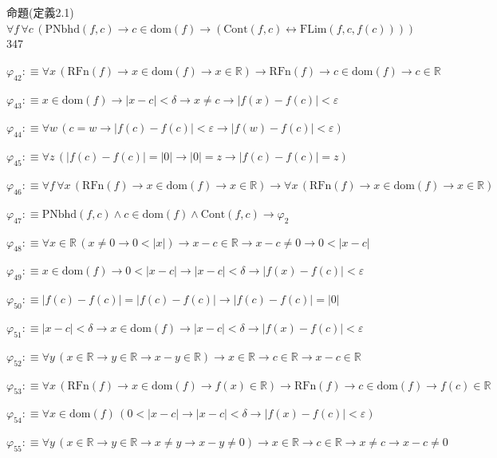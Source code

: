 \begin{fullproof}{命題(定義2.1)}{$\forall f\,\forall c\,(\mathrm{PNbhd}(f,c) \to c \in \mathrm{dom}(f) \to (\mathrm{Cont}(f,c) \leftrightarrow \mathrm{FLim}(f,c,f(c))))$}{347}
\begin{abbrevlist}
\item $\varphi_{42} :\equiv \forall x\,(\mathrm{RFn}(f) \to x \in \mathrm{dom}(f) \to x \in \mathbb{R}) \to \mathrm{RFn}(f) \to c \in \mathrm{dom}(f) \to c \in \mathbb{R}$
\item $\varphi_{43} :\equiv x \in \mathrm{dom}(f) \to \lvert x - c \rvert < \delta \to x \neq c \to \lvert f(x) - f(c) \rvert < \varepsilon$
\item $\varphi_{44} :\equiv \forall w\,(c = w \to \lvert f(c) - f(c) \rvert < \varepsilon \to \lvert f(w) - f(c) \rvert < \varepsilon)$
\item $\varphi_{45} :\equiv \forall z\,(\lvert f(c) - f(c) \rvert = \lvert 0 \rvert \to \lvert 0 \rvert = z \to \lvert f(c) - f(c) \rvert = z)$
\item $\varphi_{46} :\equiv \forall f\,\forall x\,(\mathrm{RFn}(f) \to x \in \mathrm{dom}(f) \to x \in \mathbb{R}) \to \forall x\,(\mathrm{RFn}(f) \to x \in \mathrm{dom}(f) \to x \in \mathbb{R})$
\item $\varphi_{47} :\equiv \mathrm{PNbhd}(f,c) \land c \in \mathrm{dom}(f) \land \mathrm{Cont}(f,c) \to \varphi_{2}$
\item $\varphi_{48} :\equiv \forall x \in \mathbb{R}\,(x \neq 0 \to 0 < \lvert x \rvert) \to x - c \in \mathbb{R} \to x - c \neq 0 \to 0 < \lvert x - c \rvert$
\item $\varphi_{49} :\equiv x \in \mathrm{dom}(f) \to 0 < \lvert x - c \rvert \to \lvert x - c \rvert < \delta \to \lvert f(x) - f(c) \rvert < \varepsilon$
\item $\varphi_{50} :\equiv \lvert f(c) - f(c) \rvert = \lvert f(c) - f(c) \rvert \to \lvert f(c) - f(c) \rvert = \lvert 0 \rvert$
\item $\varphi_{51} :\equiv \lvert x - c \rvert < \delta \to x \in \mathrm{dom}(f) \to \lvert x - c \rvert < \delta \to \lvert f(x) - f(c) \rvert < \varepsilon$
\item $\varphi_{52} :\equiv \forall y\,(x \in \mathbb{R} \to y \in \mathbb{R} \to x - y \in \mathbb{R}) \to x \in \mathbb{R} \to c \in \mathbb{R} \to x - c \in \mathbb{R}$
\item $\varphi_{53} :\equiv \forall x\,(\mathrm{RFn}(f) \to x \in \mathrm{dom}(f) \to f(x) \in \mathbb{R}) \to \mathrm{RFn}(f) \to c \in \mathrm{dom}(f) \to f(c) \in \mathbb{R}$
\item $\varphi_{54} :\equiv \forall x \in \mathrm{dom}(f)\,(0 < \lvert x - c \rvert \to \lvert x - c \rvert < \delta \to \lvert f(x) - f(c) \rvert < \varepsilon)$
\item $\varphi_{55} :\equiv \forall y\,(x \in \mathbb{R} \to y \in \mathbb{R} \to x \neq y \to x - y \neq 0) \to x \in \mathbb{R} \to c \in \mathbb{R} \to x \neq c \to x - c \neq 0$

\end{abbrevlist}
\end{fullproof}
